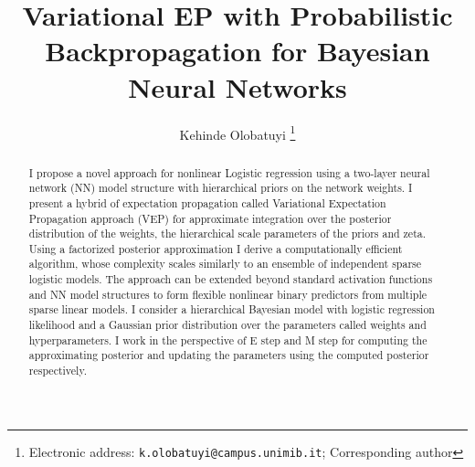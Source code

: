 \documentclass[]{article}
\title{\textbf{Variational EP with Probabilistic Backpropagation for Bayesian Neural Networks}}
\author{Kehinde Olobatuyi%
	\thanks{Electronic address: \texttt{k.olobatuyi@campus.unimib.it}; Corresponding author}}
\affil{Statistics and Mathematical Finance,\\ University of Milano-Bicocca, Italy}
\date{}
\begin{document}
\maketitle

\begin{abstract}
I propose a novel approach for nonlinear Logistic regression using a two-layer neural network (NN) model structure with hierarchical priors on the network weights. I present a hybrid of expectation propagation called Variational Expectation Propagation approach (VEP) for approximate integration over the posterior distribution of the weights, the hierarchical scale parameters of the priors and zeta. Using a factorized posterior approximation I derive a computationally efficient algorithm, whose complexity scales similarly to an ensemble of independent sparse logistic models. The approach can be extended beyond standard activation functions and NN model structures to form flexible nonlinear binary predictors from multiple sparse linear models. I consider a hierarchical Bayesian model with logistic regression likelihood and a Gaussian prior distribution over the parameters called weights and hyperparameters. I work in the perspective of E step and M step for computing the approximating posterior and updating the parameters using the computed posterior respectively.
\end{abstract}
\end{document}
